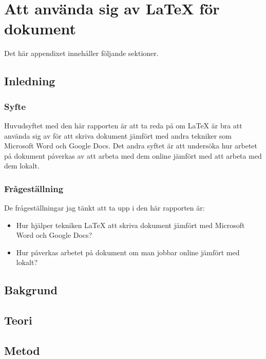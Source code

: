 \chapter{Att använda sig av LaTeX för dokument}
\label{cha:indiv-report-tuhkala}

Det här appendixet innehåller följande sektioner.

\section{Inledning}
\label{sec:introduction-tuhkala}


\subsection{Syfte}
\label{sec:purpose-tuhkala}
Huvudsyftet med den här rapporten är att ta reda på om LaTeX är bra att använda sig av för att skriva dokument jämfört med andra tekniker som Microsoft Word och Google Docs. Det andra syftet är att undersöka hur arbetet på dokument påverkas av att arbeta med dem online jämfört med att arbeta med dem lokalt.

\subsection{Frågeställning}
\label{sec:issue-tuhkala}
De frågeställningar jag tänkt att ta upp i den här rapporten är:

\begin{itemize}
	\item Hur hjälper tekniken LaTeX att skriva dokument jämfört med Microsoft Word och Google Docs?
	\item Hur påverkas arbetet på dokument om man jobbar online jämfört med lokalt?
\end{itemize}

\section{Bakgrund}
\label{sec:background-tuhkala}


\section{Teori}
\label{sec:theory-tuhkala}


\section{Metod}
\label{sec:method-tuhkala}

